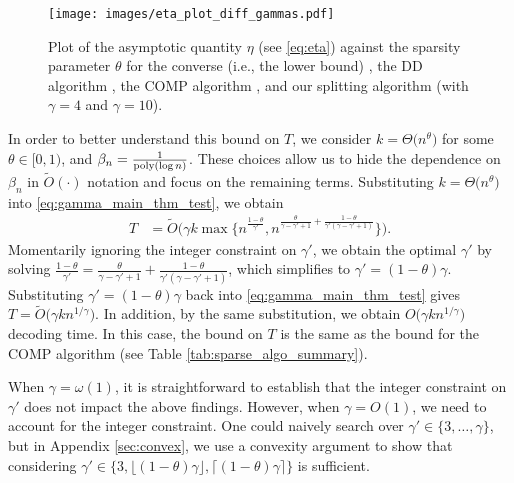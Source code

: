 \begin{figure}[!t]
  \centering
  \texttt{[image: images/eta\_plot\_diff\_gammas.pdf]}
  \caption{Plot of the asymptotic quantity $\eta$ (see \eqref{eq:eta}) against the sparsity parameter $\theta$ for the converse (i.e., the lower bound) \cite{Oli20}, the DD algorithm \cite{Oli20}, the COMP algorithm \cite{Ven19}, and our splitting algorithm (with $\gamma=4$ and $\gamma = 10$).} \label{fig:eta_plot_diff_gammas}
  \vspace*{-3ex}
\end{figure}

In order to better understand this bound on $T$, we consider $k=\Theta\big(n^{\theta}\big)$ for some $\theta\in[0,1)$, and $\beta_n = \frac{1}{{\rm poly}(\log n)}$.  These choices allow us to hide the dependence on $\beta_n$ in $\widetilde{O}(\cdot)$ notation and focus on the remaining terms. Substituting $k=\Theta\big(n^{\theta}\big)$ into \eqref{eq:gamma_main_thm_test}, we obtain
\begin{align}
    T&=\widetilde{O}\Big(\gamma k\max\Big\{n^{\frac{1-\theta}{\gamma'}},
    n^{\frac{\theta}{\gamma-\gamma'+1}+\frac{1-\theta}{\gamma'(\gamma-\gamma'+1)}}\Big\}\Big). \label{eq:regime_specific_T}
\end{align}
Momentarily ignoring the integer constraint on $\gamma'$, we obtain the optimal $\gamma'$ by solving $\frac{1-\theta}{\gamma'}=\frac{\theta}{\gamma-\gamma'+1}+\frac{1-\theta}{\gamma'(\gamma-\gamma'+1)}$, which simplifies to $\gamma'=(1-\theta)\gamma$. Substituting $\gamma'=(1-\theta)\gamma$ back into \eqref{eq:gamma_main_thm_test} gives $T=\widetilde{O}\big(\gamma kn^{1/\gamma}\big)$. In addition, by the same substitution, we obtain $O\big(\gamma kn^{1/\gamma}\big)$ decoding time. In this case, the bound on $T$ is the same as the bound for the COMP algorithm (see Table \ref{tab:sparse_algo_summary}).

When $\gamma = \omega(1)$, it is straightforward to establish that the integer constraint on $\gamma'$ does not impact the above findings. However, when $\gamma = O(1)$, we need to account for the integer constraint.  One could naively search over $\gamma'\in\{3,\dots,\gamma\}$, but in Appendix \ref{sec:convex}, we use a convexity argument to show that considering $\gamma'\in\{3,\lfloor(1-\theta)\gamma\rfloor,\lceil(1-\theta)\gamma\rceil\}$ is sufficient.

